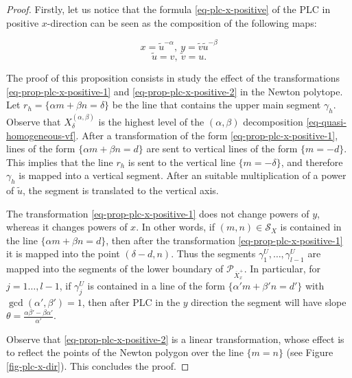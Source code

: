 \documentclass[12pt]{amsart}
\begin{document}
\begin{proof}
Firstly, let us notice that the formula \eqref{eq-plc-x-positive} of the PLC in positive $x$-direction can be seen as the composition of the following maps: \begin{multicols}{2}\noindent
\begin{equation}\label{eq-prop-plc-x-positive-1}
x = \tilde{u}^{-\alpha}, \ y = \tilde{v}\tilde{u}^{-\beta}    
\end{equation}
\begin{equation}\label{eq-prop-plc-x-positive-2}
 \tilde{u} = v, \ \tilde{v} = u.   
\end{equation} \end{multicols}

The proof of this proposition consists in study the effect of the transformations \eqref{eq-prop-plc-x-positive-1} and \eqref{eq-prop-plc-x-positive-2} in the Newton polytope. Let $r_{h} = \{\alpha m + \beta n = \delta\}$ be the line that contains the upper main segment $\gamma_{h}$. Observe that $X^{(\alpha,\beta)}_{\delta}$ is the highest level of the $(\alpha,\beta)$ decomposition \eqref{eq-quasi-homogeneous-vf}. After a transformation of the form \eqref{eq-prop-plc-x-positive-1}, lines of the form $\{\alpha m + \beta n = d\}$ are sent to vertical lines of the form $\{m = -d\}$. This implies that the line $r_{h}$ is sent to the vertical line $\{m = -\delta\}$, and therefore $\gamma_{h}$ is mapped into a vertical segment. After an suitable multiplication of a power of $\tilde{u}$, the segment is translated to the vertical axis.

The transformation \eqref{eq-prop-plc-x-positive-1} does not change powers of $y$, whereas it changes powers of $x$. In other words, if $(m,n)\in\mathcal{S}_{X}$ is contained in the line $\{\alpha m + \beta n = d\}$, then after the transformation \eqref{eq-prop-plc-x-positive-1} it is mapped into the point $(\delta - d,n)$. Thus the segments $\gamma^{U}_{1},\dots,\gamma^{U}_{l-1}$ are mapped into the segments of the lower boundary of $\mathcal{P}_{\overline{X}^{+}_{x}}$. In particular, for $j = 1\dots,l-1$, if $\gamma^{U}_{j}$ is contained in a line of the form $\{\alpha' m + \beta'n = d'\}$ with $\gcd(\alpha',\beta') = 1$, then after PLC in the $y$ direction the segment will have slope $\theta = \frac{\alpha\beta' - \beta\alpha'}{\alpha'}$.


Observe that \eqref{eq-prop-plc-x-positive-2} is a linear transformation, whose effect is to reflect the points of the Newton polygon over the line $\{m = n\}$ (see Figure \ref{fig-plc-x-dir}). This concludes the proof. \end{proof}
\end{document}
